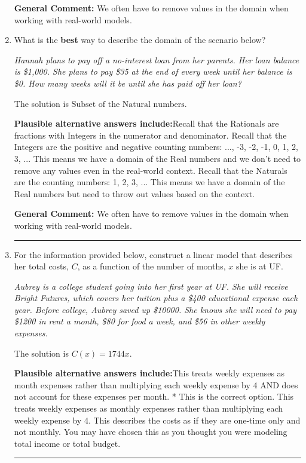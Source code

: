 \documentclass{extbook}[14pt]
\newcommand{\litem}[1]{\item #1

\rule{\textwidth}{0.4pt}}
\begin{document}
\begin{enumerate}
{\textbf{General Comment:} We often have to remove values in the domain when working with real-world models.
}
\litem{
What is the \textbf{best} way to describe the domain of the scenario below?

\begin{center}
    \textit{ Hannah plans to pay off a no-interest loan from her parents. Her loan balance is \$1,000. She plans to pay \$35 at the end of every week until her balance is \$0. How many weeks will it be until she has paid off her loan? }
\end{center}
The solution is \( \text{Subset of the Natural numbers} \).\begin{enumerate}[label=\Alph*.]
\textbf{Plausible alternative answers include:}Recall that the Rationals are fractions with Integers in the numerator and denominator.
Recall that the Integers are the positive and negative counting numbers: ..., -3, -2, -1, 0, 1, 2, 3, ... 
This means we have a domain of the Real numbers and we don't need to remove any values even in the real-world context.
Recall that the Naturals are the counting numbers: 1, 2, 3, ...
This means we have a domain of the Real numbers but need to throw out values based on the context.
\end{enumerate}

\textbf{General Comment:} We often have to remove values in the domain when working with real-world models.
}
\litem{
For the information provided below, construct a linear model that describes her total costs, $C$, as a function of the number of months, $x$ she is at UF. 

\begin{center}
    \textit{ Aubrey is a college student going into her first year at UF. She will receive Bright Futures, which covers her tuition plus a \$400 educational expense each year. Before college, Aubrey saved up \$10000. She knows she will need to pay \$1200 in rent a month, \$80 for food a week, and \$56 in other weekly expenses. }
\end{center}
The solution is \( C(x) = 1744 x \).\begin{enumerate}[label=\Alph*.]
\textbf{Plausible alternative answers include:}This treats weekly expenses as month expenses rather than multiplying each weekly expense by 4 AND does not account for these expenses per month.
* This is the correct option.
This treats weekly expenses as monthly expenses rather than multiplying each weekly expense by 4.
This describes the costs as if they are one-time only and not monthly.
You may have chosen this as you thought you were modeling total income or total budget.
\end{enumerate}

}
\end{enumerate}
\end{document}
